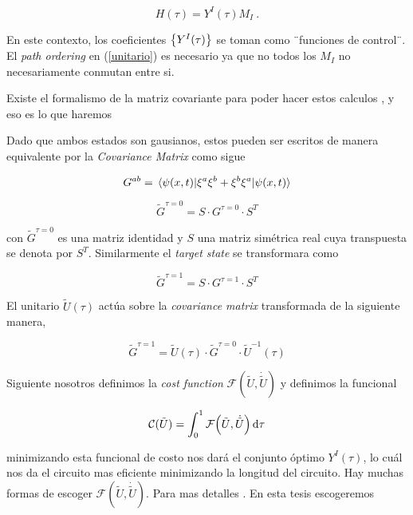 \documentclass[../Main.tex]{subfiles}
\begin{document}
\begin{equation}
 H(\tau)= Y^{I}(\tau) M_{I} \ .
\nonumber
\end{equation}

En este contexto, los coeficientes $\Bqty{Y^{I}(\tau)}$ se toman como ¨funciones de control¨. El \textit{path ordering} en (\eqref{unitario}) es necesario ya que no todos los $M_I$ no necesariamente conmutan entre si.

Existe el formalismo de la matriz covariante para poder hacer estos calculos \citep{Braunstein:2005zz}, y eso es lo que haremos

Dado que ambos estados son gausianos, estos pueden ser escritos de manera equivalente por la \textit{Covariance Matrix} como sigue\citep{Weedbrook_2012}

\begin{equation}
G^{ab}=\ev{\xi^{a}\xi^{b}+\xi^{b}\xi^{a}}{\psi(x,t)}
\end{equation} 



\begin{equation}
\tilde G^{\tau=0}= S\cdot G^{\tau=0}\cdot S^T
\end{equation}

con $\tilde G^{\tau=0}$ es una matriz identidad y $S$ una matriz simétrica real cuya transpuesta se denota por $S^T$. Similarmente el \textit{target state} se transformara como

\begin{equation}
\tilde G^{\tau=1}= S\cdot G^{\tau=1}\cdot S^{T}
\end{equation}

El unitario $\tilde U(\tau)$ actúa sobre la \textit{covariance matrix} transformada de la siguiente manera,

\begin{equation}
\tilde G^{\tau=1}= \tilde U(\tau)\cdot \tilde G^{\tau=0}\cdot\tilde U^{-1}(\tau)
\end{equation}

Siguiente nosotros definimos la \textit{cost function}  $\mathcal{F}(\tilde U, \dot {\tilde U})$ y definimos la funcional \citep{Ali_2019}

\begin{equation}
\mathcal{C}(\tilde U)=\int_{0}^{1} \mathcal{F}\pqty{\tilde U,\dot{\tilde U}} \dd{\tau} 
\end{equation}

minimizando esta funcional de costo nos dará el conjunto óptimo $Y^{I}(\tau)$, lo cuál nos da el circuito mas eficiente minimizando la longitud del circuito. Hay muchas formas de escoger $\mathcal{F}(\tilde U,\dot{\tilde U})$. Para mas detalles \citep{Nielsen_2006}. En esta tesis escogeremos
\end{document}
